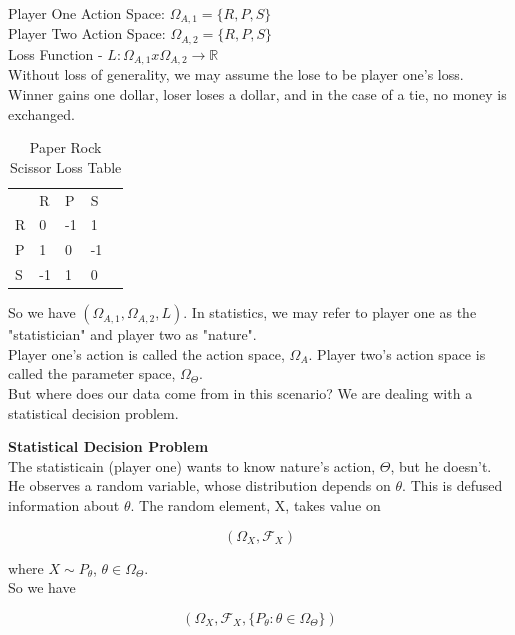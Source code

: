 \documentclass[11pt,fleqn]{book} %
\begin{document}
	Player One Action Space: $\Omega_{A, 1} = \{R, P, S\}$\\

	Player Two Action Space: $\Omega_{A, 2} = \{R, P, S\}$\\

	Loss Function - $L: \Omega_{A, 1} x \Omega_{A, 2} \rightarrow \mathbb{R}$\\

	Without loss of generality, we may assume the lose to be player one's loss. \\

	Winner gains one dollar, loser loses a dollar, and in the case of a tie, no money is exchanged. 


					\begin{table}[]
				\centering
				\caption{Paper Rock Scissor Loss Table}
				\label{PRS_Loss}
				\begin{tabular}{lllll}
				  & R  & P  & S  &  \\
				R & 0  & -1 & 1  &  \\
				P & 1  & 0  & -1 &  \\
				S & -1 & 1  & 0  & 
				\end{tabular}
				\end{table}


So we have $(\Omega_{A,1}, \Omega_{A, 2}, L)$. In statistics, we may refer to player one as the "statistician" and player two as "nature".\\

Player one's action is called the action space, $\Omega_A$. Player two's action space is called the parameter space, $\Omega_\Theta$.\\


But where does our data come from in this scenario? We are dealing with a statistical decision problem. 

\textbf{Statistical Decision Problem}\\

The statisticain (player one) wants to know nature's action, $\Theta$, but he doesn't. He observes a random variable, whose distribution depends on $\theta$. This is defused information about $\theta$. The random element, X, takes value on 

	$$(\Omega_X, \mathcal{F}_X)  $$

	where $X \sim P_\theta$, $\theta \in \Omega_\Theta$. \\


So we have

			$$ (\Omega_X, \mathcal{F}_X, \{P_\theta: \theta \in \Omega_\Theta\}) $$
\end{document}
